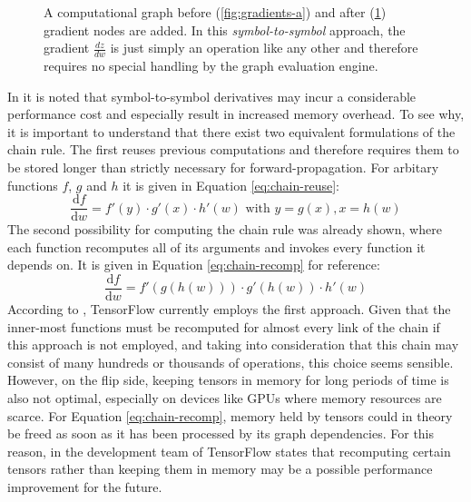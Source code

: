 \begin{figure}
\begin{subfigure}[b]{0.2\textwidth}
    \caption{}
    \label{fig:gradients-b}
  \end{subfigure}
  \caption{A computational graph before (\ref{fig:gradients-a}) and after
    (\ref{fig:gradients-b}) gradient nodes are added. In this
    \emph{symbol-to-symbol} approach, the gradient $\frac{dz}{dw}$ is just
    simply an operation like any other and therefore requires no special
    handling by the graph evaluation engine.}
  \label{fig:gradients}
\end{figure}

In \cite{tensorflow} it is noted that symbol-to-symbol derivatives may incur a
considerable performance cost and especially result in increased memory
overhead. To see why, it is important to understand that there exist two
equivalent formulations of the chain rule. The first reuses previous
computations and therefore requires them to be stored longer than strictly
necessary for forward-propagation. For arbitary functions $f$, $g$ and $h$ it is
given in Equation \ref{eq:chain-reuse}:
\begin{equation}\label{eq:chain-reuse}
  \frac{\mathrm{d} f}{\mathrm{d} w} = f'(y) \cdot g'(x) \cdot h'(w) \text{ with } y = g(x), x =
  h(w)
\end{equation}
The second possibility for computing the chain rule was already shown, where
each function recomputes all of its arguments and invokes every function it
depends on. It is given in Equation \ref{eq:chain-recomp} for reference:
\begin{equation}\label{eq:chain-recomp}
  \frac{\mathrm{d} f}{\mathrm{d} w} = f'(g(h(w))) \cdot g'(h(w)) \cdot h'(w)
\end{equation}
According to \cite{tensorflow}, TensorFlow currently employs the first
approach. Given that the inner-most functions must be recomputed for almost
every link of the chain if this approach is not employed, and taking into
consideration that this chain may consist of many hundreds or thousands of
operations, this choice seems sensible. However, on the flip side, keeping
tensors in memory for long periods of time is also not optimal, especially on
devices like GPUs where memory resources are scarce. For Equation
\ref{eq:chain-recomp}, memory held by tensors could in theory be freed as soon
as it has been processed by its graph dependencies. For this reason, in
\cite{tensorflow} the development team of TensorFlow states that recomputing
certain tensors rather than keeping them in memory may be a possible performance
improvement for the future.

